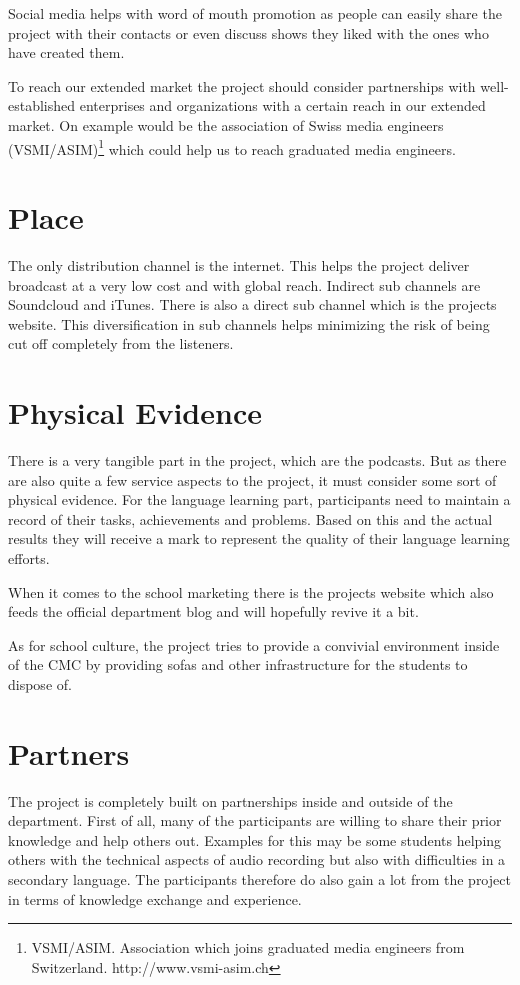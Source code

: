 Social media helps with word of mouth promotion as people can easily
share the project with their contacts or even discuss shows they liked
with the ones who have created them.

To reach our extended market the project should consider partnerships
with well-established enterprises and organizations with a certain reach
in our extended market. On example would be the association of Swiss
media engineers (VSMI/ASIM)\footnote{VSMI/ASIM. Association which joins
  graduated media engineers from Switzerland. http://www.vsmi-asim.ch}
which could help us to reach graduated media engineers.

\section{Place}

The only distribution channel is the internet. This helps the project
deliver broadcast at a very low cost and with global reach. Indirect sub
channels are Soundcloud and iTunes. There is also a direct sub channel
which is the projects website. This diversification in sub channels
helps minimizing the risk of being cut off completely from the
listeners.

\section{Physical Evidence}

There is a very tangible part in the project, which are the podcasts.
But as there are also quite a few service aspects to the project, it
must consider some sort of physical evidence. For the language learning
part, participants need to maintain a record of their tasks,
achievements and problems. Based on this and the actual results they
will receive a mark to represent the quality of their language learning
efforts.

When it comes to the school marketing there is the projects website
which also feeds the official department blog and will hopefully revive
it a bit.

As for school culture, the project tries to provide a convivial
environment inside of the CMC by providing sofas and other
infrastructure for the students to dispose of.

\section{Partners}

The project is completely built on partnerships inside and outside of
the department. First of all, many of the participants are willing to
share their prior knowledge and help others out. Examples for this may
be some students helping others with the technical aspects of audio
recording but also with difficulties in a secondary language. The
participants therefore do also gain a lot from the project in terms of
knowledge exchange and experience.

